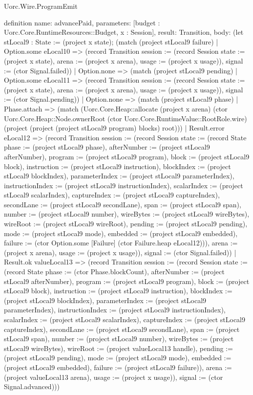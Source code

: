 \begin{lexlean}{Uorc.Wire.ProgramEmit}
\begin{semanticmodule}
definition{
  name: advancePaid,
  parameters: [budget : Uorc.Core.RuntimeResources::Budget, x : Session],
  result: Transition,
  body: (let stLocal9 : State := (project x state); (match (project stLocal9 failure)
    | Option.some eLocal10 => (record Transition {session := (record Session {state := (project x state), arena := (project x arena), usage := (project x usage)}), signal := (ctor Signal.failed)})
    | Option.none => (match (project stLocal9 pending)
      | Option.some eLocal11 => (record Transition {session := (record Session {state := (project x state), arena := (project x arena), usage := (project x usage)}), signal := (ctor Signal.pending)})
      | Option.none => (match (project stLocal9 phase)
        | Phase.attach => (match (Uorc.Core.Heap::allocate (project x arena) (ctor Uorc.Core.Heap::Node.ownerRoot (ctor Uorc.Core.RuntimeValue::RootRole.wire) (project (project (project stLocal9 program) blocks) root)))
          | Result.error eLocal12 => (record Transition {session := (record Session {state := (record State {phase := (project stLocal9 phase), afterNumber := (project stLocal9 afterNumber), program := (project stLocal9 program), block := (project stLocal9 block), instruction := (project stLocal9 instruction), blockIndex := (project stLocal9 blockIndex), parameterIndex := (project stLocal9 parameterIndex), instructionIndex := (project stLocal9 instructionIndex), scalarIndex := (project stLocal9 scalarIndex), captureIndex := (project stLocal9 captureIndex), secondLane := (project stLocal9 secondLane), span := (project stLocal9 span), number := (project stLocal9 number), wireBytes := (project stLocal9 wireBytes), wireRoot := (project stLocal9 wireRoot), pending := (project stLocal9 pending), mode := (project stLocal9 mode), embedded := (project stLocal9 embedded), failure := (ctor Option.some [Failure] (ctor Failure.heap eLocal12))}), arena := (project x arena), usage := (project x usage)}), signal := (ctor Signal.failed)})
          | Result.ok valueLocal13 => (record Transition {session := (record Session {state := (record State {phase := (ctor Phase.blockCount), afterNumber := (project stLocal9 afterNumber), program := (project stLocal9 program), block := (project stLocal9 block), instruction := (project stLocal9 instruction), blockIndex := (project stLocal9 blockIndex), parameterIndex := (project stLocal9 parameterIndex), instructionIndex := (project stLocal9 instructionIndex), scalarIndex := (project stLocal9 scalarIndex), captureIndex := (project stLocal9 captureIndex), secondLane := (project stLocal9 secondLane), span := (project stLocal9 span), number := (project stLocal9 number), wireBytes := (project stLocal9 wireBytes), wireRoot := (project valueLocal13 handle), pending := (project stLocal9 pending), mode := (project stLocal9 mode), embedded := (project stLocal9 embedded), failure := (project stLocal9 failure)}), arena := (project valueLocal13 arena), usage := (project x usage)}), signal := (ctor Signal.advanced)}))
}
\end{semanticmodule}
\end{lexlean}
